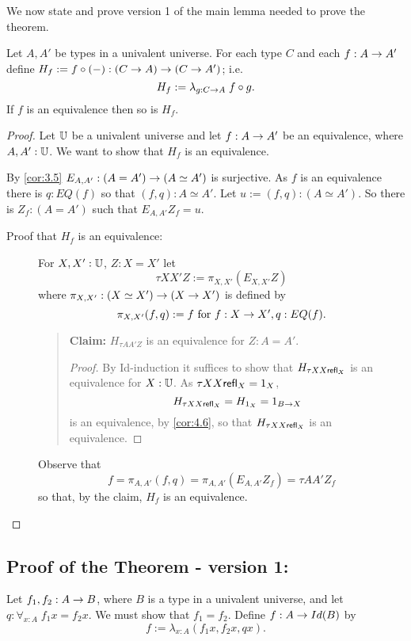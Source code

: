 We now state and  prove version 1 of the main lemma needed to prove the theorem.
\begin{lem}\label{fe:lem-main1}\label{lem:5.1}
Let $A,A'$ be types in a univalent universe.  For each type $C$ and each
$f:A\rightarrow A'$ define $H_f := f\circ(-): (C\rightarrow A)\rightarrow (C\rightarrow A')$; i.e.
  \[ H_f := \lambda_{g:C\rightarrow A}\;  f\circ g.\]
If $f$ is an equivalence then so is $H_f$.
\end{lem}
\begin{proof} Let $\mathbb{U}$ be a univalent universe and let $f:A\rightarrow A'$ be an equivalence, where $A,A':\mathbb{U}$.  We want to show that $H_f$ is an equivalence.

By \autoref{cor:3.5} $E_{A,A'}:(A=A')\rightarrow (A\simeq A')$ is surjective.  
As $f$ is an equivalence there is $q:EQ(f)$ so that $(f,q):A\simeq A'$. Let $u:=(f,q):(A\simeq A')$.  So there is $Z_f:(A=A')$ such that $E_{A,A'}Z_f = u$.

\begin{description}
\item[Proof that $H_f$ is an equivalence:]
For $X,X':\mathbb{U}$, $Z:X=X'$ let 
  \[\tau X X' Z:= \pi_{X,X'}( E_{X,X'}Z)\]
where $\pi_{X,X'}:(X\simeq X')\rightarrow (X\rightarrow X')$ is defined by
  \[ \pi_{X,X'}(f,q):= f\mbox{ for $f:X\rightarrow X',q:EQ(f)$}.\]
 \begin{quote}
{\bf Claim:} $H_{\tau A A' Z}$ is an equivalence for $Z:A=A'$.\\
\begin{proof} By Id-induction it suffices to show that $H_{\tau X X \mathsf{refl}_{X}}$ is an equivalence for $X:\mathbb{U}$.  As $\tau X X\mathsf{refl}_{X}=1_X$,
  \[ H_{\tau X X\mathsf{refl}_{X}} = H_{1_X}=1_{B\rightarrow X}\]
is an equivalence, by \autoref{cor:4.6}, so that 
$H_{\tau X X \mathsf{refl}_{X}}$ is an equivalence.
\end{proof}
\end{quote}
Observe that
  \[ f = \pi_{A,A'}(f,q)=\pi_{A,A'}(E_{A,A'}Z_f)=\tau A A' Z_f\]
so that, by the claim, $H_f$ is an equivalence.
\end{description}
\end{proof}

\subsection{Proof of the Theorem - version 1: } 

Let $f_1,f_2:A\rightarrow B$, where $B$ is a type in a univalent universe, and let 
$q:\forall_{x:A}\; f_1x=f_2x$.  We must show that $f_1=f_2$.
Define $f:A\rightarrow Id(B)$ by
  \[ f := \lambda_{x:A}(f_1x,f_2x,qx).\]

